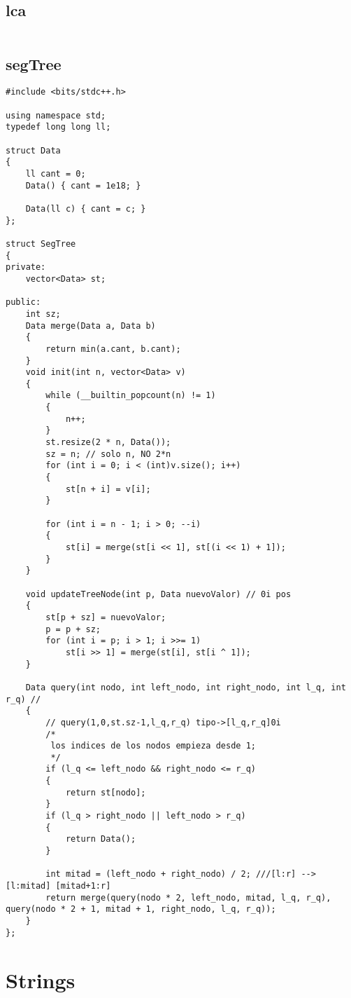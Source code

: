 \subsection*{lca}
\begin{lstlisting}
\end{lstlisting}

\subsection*{segTree}
\begin{lstlisting}
#include <bits/stdc++.h>

using namespace std;
typedef long long ll;

struct Data
{
    ll cant = 0;
    Data() { cant = 1e18; }

    Data(ll c) { cant = c; }
};

struct SegTree
{
private:
    vector<Data> st;

public:
    int sz;
    Data merge(Data a, Data b)
    {
        return min(a.cant, b.cant);
    }
    void init(int n, vector<Data> v)
    {
        while (__builtin_popcount(n) != 1)
        {
            n++;
        }
        st.resize(2 * n, Data());
        sz = n; // solo n, NO 2*n
        for (int i = 0; i < (int)v.size(); i++)
        {
            st[n + i] = v[i];
        }

        for (int i = n - 1; i > 0; --i)
        {
            st[i] = merge(st[i << 1], st[(i << 1) + 1]);
        }
    }

    void updateTreeNode(int p, Data nuevoValor) // 0i pos
    {
        st[p + sz] = nuevoValor;
        p = p + sz;
        for (int i = p; i > 1; i >>= 1)
            st[i >> 1] = merge(st[i], st[i ^ 1]);
    }

    Data query(int nodo, int left_nodo, int right_nodo, int l_q, int r_q) //
    {
        // query(1,0,st.sz-1,l_q,r_q) tipo->[l_q,r_q]0i
        /*
         los indices de los nodos empieza desde 1;
         */
        if (l_q <= left_nodo && right_nodo <= r_q)
        {
            return st[nodo];
        }
        if (l_q > right_nodo || left_nodo > r_q)
        {
            return Data();
        }

        int mitad = (left_nodo + right_nodo) / 2; ///[l:r] --> [l:mitad] [mitad+1:r]
        return merge(query(nodo * 2, left_nodo, mitad, l_q, r_q), query(nodo * 2 + 1, mitad + 1, right_nodo, l_q, r_q));
    }
};
\end{lstlisting}

\section*{Strings}

